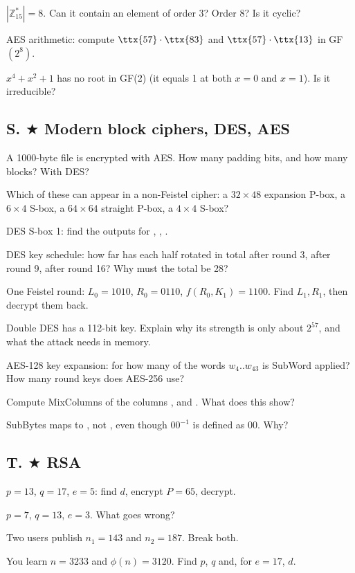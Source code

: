 \q $|\mathbb{Z}_{15}^*| = 8$. Can it contain an element of order 3? Order 8? Is it cyclic?

\q AES arithmetic: compute $\ttx{57} \cdot \ttx{83}$ and $\ttx{57} \cdot \ttx{13}$ in GF$(2^8)$.

\q $x^4 + x^2 + 1$ has no root in GF(2) (it equals 1 at both $x = 0$ and $x = 1$). Is it irreducible?

\subsection*{S. $\bigstar$ Modern block ciphers, DES, AES}
\q A 1000-byte file is encrypted with AES. How many padding bits, and how many blocks? With DES?

\q Which of these can appear in a non-Feistel cipher: a $32 \times 48$ expansion P-box, a $6 \times 4$ S-box, a $64 \times 64$ straight P-box, a $4 \times 4$ S-box?

\q DES S-box 1: find the outputs for , , .

\q DES key schedule: how far has each half rotated in total after round 3, after round 9, after round 16? Why must the total be 28?

\q One Feistel round: $L_0 = 1010$, $R_0 = 0110$, $f(R_0, K_1) = 1100$. Find $L_1, R_1$, then decrypt them back.

\q Double DES has a 112-bit key. Explain why its strength is only about $2^{57}$, and what the attack needs in memory.

\q AES-128 key expansion: for how many of the words $w_4..w_{43}$ is SubWord applied? How many round keys does AES-256 use?

\q Compute MixColumns of the columns \ttx{[01 01 01 01]}, \ttx{[C6 C6 C6 C6]} and \ttx{[01 00 00 00]}. What does this show?

\q SubBytes maps  to , not , even though $00^{-1}$ is defined as $00$. Why?

\subsection*{T. $\bigstar$ RSA}
\q $p = 13$, $q = 17$, $e = 5$: find $d$, encrypt $P = 65$, decrypt.

\q $p = 7$, $q = 13$, $e = 3$. What goes wrong?

\q Two users publish $n_1 = 143$ and $n_2 = 187$. Break both.

\q You learn $n = 3233$ and $\phi(n) = 3120$. Find $p$, $q$ and, for $e = 17$, $d$.

